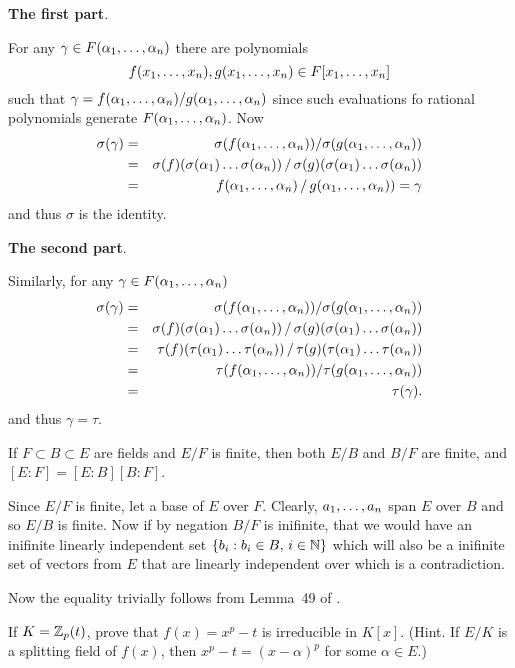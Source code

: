 \begin{myenumerate}
\textbf{The first part}.

For any \(\gamma\in F(\alpha_1,\ldots,\alpha_{n})\) there are polynomials
\[f(x_1,\ldots,x_{n}),g(x_1,\ldots,x_{n})\in F[x_1,\ldots,x_{n}]\]
 such that
\(\gamma = f(\alpha_1,\ldots,\alpha_{n})/g(\alpha_1,\ldots,\alpha_{n})\) since such evaluations
fo rational polynomials generate \(F(\alpha_1,\ldots,\alpha_{n})\).
Now
\begin{eqnarray*}
 \sigma(\gamma)
 & = & \sigma(f(\alpha_1,\ldots,\alpha_{n})) / \sigma(g(\alpha_1,\ldots,\alpha_{n})) \\
 & = & \sigma(f)(\sigma(\alpha_1)\ldots\sigma(\alpha_n)) \,/\,
       \sigma(g)(\sigma(\alpha_1)\ldots\sigma(\alpha_n)) \\
 & = & f(\alpha_1,\ldots,\alpha_{n}) \,/\, g(\alpha_1,\ldots,\alpha_{n})) = \gamma
\end{eqnarray*}
and thus \(\sigma\) is the identity.

\textbf{The second part}.

Similarly, for any \(\gamma\in F(\alpha_1,\ldots,\alpha_{n})\)
\begin{eqnarray*}
 \sigma(\gamma)
 & = & \sigma(f(\alpha_1,\ldots,\alpha_{n})) / \sigma(g(\alpha_1,\ldots,\alpha_{n})) \\
 & = & \sigma(f)(\sigma(\alpha_1)\ldots\sigma(\alpha_n)) \,/\,
       \sigma(g)(\sigma(\alpha_1)\ldots\sigma(\alpha_n)) \\
 & = & \tau(f)(\tau(\alpha_1)\ldots\tau(\alpha_n)) \,/\,
       \tau(g)(\tau(\alpha_1)\ldots\tau(\alpha_n)) \\
 & = & \tau(f(\alpha_1,\ldots,\alpha_{n})) / \tau(g(\alpha_1,\ldots,\alpha_{n})) \\
 & = & \tau(\gamma).
\end{eqnarray*}
and thus \(\gamma=\tau\).

\item
\begin{excopy}
If \(F \subset B \subset E\) are fields  and \(E/F\) is finite,
then both \(E/B\) and \(B/F\) are finite, and
\([E:F] = [E:B][B:F]\).
\end{excopy}

Since \(E/F\) is finite, let  a base of $E$ over $F$.
Clearly, \(a_1,\ldots,a_{n}\) span $E$ over $B$ and so \(E/B\) is finite.
Now if by negation \(B/F\) is inifinite, that we would have an inifinite
linearly independent set \(\{b_i: b_i\in B,\, i\in \mathbb{N}\}\)
which will also be a inifinite set of vectors from $E$
that are linearly independent over which is a contradiction.

Now the equality trivially follows from
Lemma~49 of \cite{Rotman98}.


\item
\begin{excopy}
If \(K=\mathbb{Z}_p(t)\), prove that \(f(x)=x^p-t\) is irreducible in \(K[x]\).
(Hint. If \(E/K\) is a splitting field of \(f(x)\), then \(x^p-t=(x-\alpha)^p\)
for some \(\alpha\in E\).)
\end{excopy}


\end{myenumerate}

